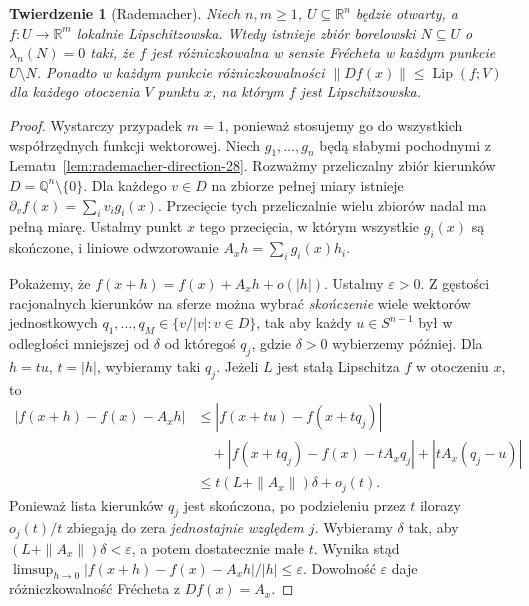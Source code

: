 \documentclass[11pt,a4paper,oneside]{book}
\numberwithin{equation}{chapter}
\theoremstyle{plain}
\newtheorem{twierdzenie}{Twierdzenie}[chapter]
\theoremstyle{definition}
\theoremstyle{remark}
\begin{document}
\begin{twierdzenie}[Rademacher]
\label{thm:rademacher-28}
Niech $n,m\ge1$, $U\subseteq\mathbb R^n$ będzie
otwarty, a $f:U\to\mathbb R^m$ lokalnie Lipschitzowska.
Wtedy istnieje zbiór borelowski $N\subseteq U$ o
$\lambda_n(N)=0$ taki, że $f$ jest różniczkowalna
w sensie Frécheta w każdym punkcie $U\setminus N$.
Ponadto w każdym punkcie różniczkowalności
$\|Df(x)\|\le\operatorname{Lip}(f;V)$ dla
każdego otoczenia $V$ punktu $x$, na którym $f$
jest Lipschitzowska.
\end{twierdzenie}
\begin{proof}
Wystarczy przypadek $m=1$, ponieważ stosujemy go
do wszystkich współrzędnych funkcji wektorowej.
Niech $g_1,\ldots,g_n$ będą słabymi pochodnymi z
Lematu~\ref{lem:rademacher-direction-28}. Rozważmy
przeliczalny zbiór kierunków $D=\mathbb Q^n\setminus\{0\}$.
Dla każdego $v\in D$ na zbiorze pełnej miary
istnieje $\partial_v f(x)=\sum_i v_i g_i(x)$.
Przecięcie tych przeliczalnie wielu zbiorów nadal
ma pełną miarę. Ustalmy punkt $x$ tego przecięcia,
w którym wszystkie $g_i(x)$ są skończone, i liniowe
odwzorowanie $A_xh=\sum_i g_i(x)h_i$.

Pokażemy, że $f(x+h)=f(x)+A_xh+o(|h|)$.
Ustalmy $\varepsilon>0$. Z gęstości racjonalnych
kierunków na sferze można wybrać \emph{skończenie}
wiele wektorów jednostkowych
$q_1,\ldots,q_M\in\{v/|v|:v\in D\}$, tak aby
każdy $u\in S^{n-1}$ był w odległości mniejszej
od $\delta$ od któregoś $q_j$, gdzie
$\delta>0$ wybierzemy później. Dla $h=tu$, $t=|h|$,
wybieramy taki $q_j$. Jeżeli $L$ jest stałą
Lipschitza $f$ w otoczeniu $x$, to
\begin{align*}
 |f(x+h)-f(x)-A_xh|
 &\le |f(x+tu)-f(x+tq_j)|\\
 &\quad+|f(x+tq_j)-f(x)-tA_xq_j|
       +|tA_x(q_j-u)|\\
 &\le t(L+\|A_x\|)\delta+o_j(t).
\end{align*}
Ponieważ lista kierunków $q_j$ jest skończona,
po podzieleniu przez $t$ ilorazy $o_j(t)/t$
zbiegają do zera \emph{jednostajnie względem $j$}.
Wybieramy $\delta$ tak, aby
$(L+\|A_x\|)\delta<\varepsilon$, a potem
dostatecznie małe $t$. Wynika stąd
$\limsup_{h\to0}|f(x+h)-f(x)-A_xh|/|h|\le\varepsilon$.
Dowolność $\varepsilon$ daje różniczkowalność
Frécheta z $Df(x)=A_x$.


\end{proof}
\end{document}
